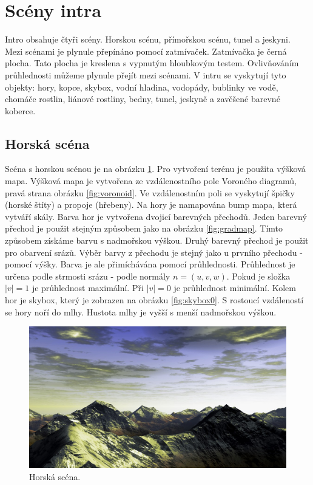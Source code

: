 
\section{Scény intra}
Intro obsahuje čtyři scény.
Horskou scénu, přímořskou scénu, tunel a jeskyni.
Mezi scénami je plynule přepínáno pomocí zatmívaček.
Zatmívačka je černá plocha.
Tato plocha je kreslena s vypnutým hloubkovým testem.
Ovlivňováním průhlednosti můžeme plynule přejít mezi scénami.
V intru se vyskytují tyto objekty: hory, kopce, skybox, vodní hladina, vodopády, bublinky ve vodě, 
chomáče rostlin, liánové rostliny, bedny, tunel, jeskyně a zavěšené barevné koberce.
\subsection{Horská scéna}
Scéna s horskou scénou je na obrázku \ref{fig:hory}.
Pro vytvoření terénu je použita výšková mapa.
Výšková mapa je vytvořena ze vzdálenostního pole Voroného diagramů, pravá strana ob\-ráz\-ku \ref{fig:voronoid}.
Ve vzdálenostním poli se vyskytují špičky (horské štíty) a propoje (hřebeny).
Na hory je namapována bump mapa, která vytváří skály.
Barva hor je vytvořena dvojicí barevných přechodů.
Jeden barevný přechod je použit stejným způsobem jako na obrázku \ref{fig:gradmap}.
Tímto způsobem získáme barvu s nadmořskou výškou.
Druhý barevný přechod je použit pro obarvení srázů.
Výběr barvy z přechodu je stejný jako u prvního přechodu - pomocí výšky.
Barva je ale přimíchávána pomocí průhlednosti.
Průhlednost je určena podle strmosti srázu - podle normály $n=(u,v,w)$.
Pokud je složka $|v|=1$ je průhlednost maximální.
Při $|v|=0$ je průhlednost minimální.
Kolem hor je skybox, který je zobrazen na obrázku \ref{fig:skybox0}.
S rostoucí vzdáleností se hory noří do mlhy.
Hustota mlhy je vyšší s menší nadmořskou výškou.
\begin{figure}[h]
\centering
\includegraphics[width=15cm,keepaspectratio]{obr/hory0.jpg}
\caption{Horská scéna.}
\label{fig:hory}
\end{figure}

